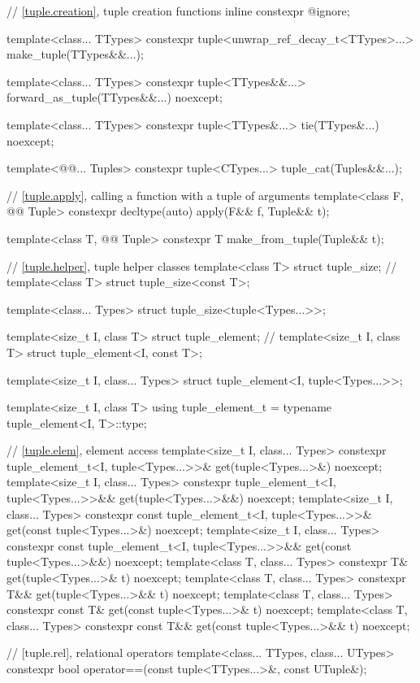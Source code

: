 \documentclass{wg21}
\begin{document}
\begin{codeblock}

// \ref{tuple.creation}, tuple creation functions
inline constexpr @\unspec@ ignore;

template<class... TTypes>
constexpr tuple<unwrap_ref_decay_t<TTypes>...> make_tuple(TTypes&&...);

template<class... TTypes>
constexpr tuple<TTypes&&...> forward_as_tuple(TTypes&&...) noexcept;

template<class... TTypes>
constexpr tuple<TTypes&...> tie(TTypes&...) noexcept;

template<@@... Tuples>
constexpr tuple<CTypes...> tuple_cat(Tuples&&...);

// \ref{tuple.apply}, calling a function with a tuple of arguments
template<class F, @@ Tuple>
constexpr decltype(auto) apply(F&& f, Tuple&& t);

template<class T, @@ Tuple>
constexpr T make_from_tuple(Tuple&& t);

// \ref{tuple.helper}, tuple helper classes
template<class T> struct tuple_size;                  // \notdef
template<class T> struct tuple_size<const T>;

template<class... Types> struct tuple_size<tuple<Types...>>;

template<size_t I, class T> struct tuple_element;     // \notdef
template<size_t I, class T> struct tuple_element<I, const T>;

template<size_t I, class... Types>
struct tuple_element<I, tuple<Types...>>;

template<size_t I, class T>
using tuple_element_t = typename tuple_element<I, T>::type;

// \ref{tuple.elem}, element access
template<size_t I, class... Types>
constexpr tuple_element_t<I, tuple<Types...>>& get(tuple<Types...>&) noexcept;
template<size_t I, class... Types>
constexpr tuple_element_t<I, tuple<Types...>>&& get(tuple<Types...>&&) noexcept;
template<size_t I, class... Types>
constexpr const tuple_element_t<I, tuple<Types...>>& get(const tuple<Types...>&) noexcept;
template<size_t I, class... Types>
constexpr const tuple_element_t<I, tuple<Types...>>&& get(const tuple<Types...>&&) noexcept;
template<class T, class... Types>
constexpr T& get(tuple<Types...>& t) noexcept;
template<class T, class... Types>
constexpr T&& get(tuple<Types...>&& t) noexcept;
template<class T, class... Types>
constexpr const T& get(const tuple<Types...>& t) noexcept;
template<class T, class... Types>
constexpr const T&& get(const tuple<Types...>&& t) noexcept;

// [tuple.rel], relational operators
template<class... TTypes, class... UTypes>
constexpr bool operator==(const tuple<TTypes...>&, const UTuple&);\end{codeblock}
\end{document}
